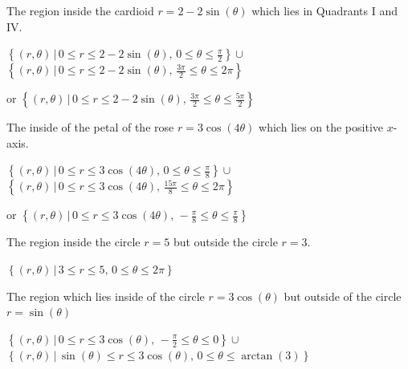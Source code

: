 \documentclass{ximera}
\begin{document}
\begin{question}
\begin{problem}
The region inside the cardioid $r = 2-2\sin(\theta)$ which lies in Quadrants I and IV.

\begin{solution}
$\left\{ (r,\theta) \, | \, 0 \leq r \leq 2-2\sin(\theta), \, 0 \leq \theta \leq \frac{\pi}{2}  \right\} \cup$ 
$\left\{ (r,\theta) \, | \, 0 \leq r \leq  2-2\sin(\theta), \, \frac{3\pi}{2} \leq \theta \leq 2\pi  \right\}$

or  $\left\{ (r,\theta) \, | \, 0 \leq r \leq 2-2\sin(\theta), \, \frac{3\pi}{2} \leq \theta \leq \frac{5\pi}{2}  \right\}$

\end{solution}
\end{problem}

\begin{problem}
The inside of the petal of the rose $r = 3\cos(4\theta)$ which lies on the positive $x$-axis.

\begin{solution}
$\left\{ (r,\theta) \, | \, 0 \leq r \leq 3\cos(4\theta), \,0 \leq \theta \leq \frac{\pi}{8} \right\} \cup$ $\left\{ (r,\theta) \, | \, 0 \leq r \leq 3\cos(4\theta), \,\frac{15\pi}{8} \leq \theta \leq 2\pi \right\}$  

or $\left\{ (r,\theta) \, | \, 0 \leq r \leq 3\cos(4\theta), \, -\frac{\pi}{8} \leq \theta \leq \frac{\pi}{8} \right\}$
\end{solution}
\end{problem}

\begin{problem}
The region inside the circle $r=5$ but outside the circle $r=3$.

\begin{solution}
$\left\{ (r,\theta) \, | \, 3 \leq r \leq 5, \, 0 \leq \theta \leq 2\pi \right\}$
\end{solution}
\end{problem}

\begin{problem}
The region which lies inside of the circle $r = 3\cos(\theta)$ but outside of the circle $r = \sin(\theta)$

\begin{solution}
$\left\{ (r,\theta) \, | \, 0 \leq r \leq 3\cos(\theta), \, -\frac{\pi}{2} \leq \theta \leq 0 \right\} \cup$ 
$\left\{ (r,\theta) \, | \, \sin(\theta) \leq r \leq 3\cos(\theta), \, 0 \leq \theta \leq \arctan(3) \right\}$
\end{solution}
\end{problem}


\end{question}
\end{document}
